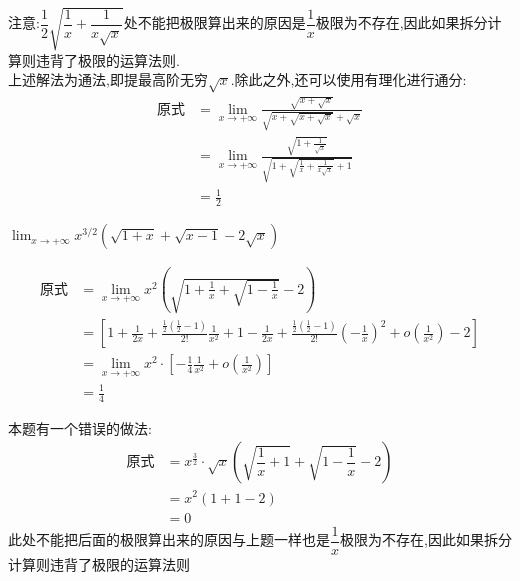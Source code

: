 \documentclass[8pt a4paper, oneside, UTF8]{ctexbook}
\begin{document}
\begin{sloppypar}
\begin{note}
        注意:$\dfrac{1}{2}\sqrt{\dfrac{1}{x}+\dfrac{1}{x\sqrt{x}}}$处不能把极限算出来的原因是$\dfrac{1}{x}$极限为不存在,因此如果拆分计算则违背了极限的运算法则.\\
        上述解法为通法,即提最高阶无穷$\sqrt{x}$.除此之外,还可以使用有理化进行通分:
        \begin{align*}
            \text{原式} & =\lim_{x\to+\infty}\frac{\sqrt{x+\sqrt{x}}}{\sqrt{x+\sqrt{x+\sqrt{x}}}+\sqrt{x}}                  \\
                      & = \lim_{x\to+\infty}\frac{\sqrt{1+\frac1{\sqrt{x}}}}{\sqrt{1+\sqrt{\frac1x+\frac1{x\sqrt{x}}}+1}} \\
                      & = \frac{1}{2}
        \end{align*}
    \end{note}
    \begin{problem}
    \uline{$\lim_{x\to+\infty}x^{3/2}\left(\sqrt{1+x}+\sqrt{x-1}-2\sqrt{x}\right)$}
    \end{problem}
    \begin{solution}
        \begin{align*}
            \text{原式} & = \lim_{x\to+\infty}  x^2(\sqrt{1+\frac{1}{x}+\sqrt{1-\frac{1}{x}}}-2)                                                                                              \\
                      & = [1+\frac{1}{2x}+\frac{\frac{1}{2}(\frac{1}{2}-1)}{2!}\frac{1}{x^{2}}+1-\frac{1}{2x}+\frac{\frac{1}{2}(\frac{1}{2}-1)}{2!}(-\frac{1}{x})^{2}+o(\frac{1}{x^{2}})-2] \\
                      & = \lim_{x\to+\infty}x^{2}\cdot[-\frac{1}{4}\frac{1}{x^{2}}+o(\frac{1}{x^{2}})]                                                                                      \\
                      & = \frac{1}{4}
        \end{align*}
    \end{solution}
    \begin{note}
        本题有一个错误的做法:
        \begin{align*}
            \text{原式} & = x^{\frac{3}{2}}\cdot \sqrt{x}(\sqrt{\dfrac{1}{x}+1}+\sqrt{1-\dfrac{1}{x}}-2) \\
                      & = x^2(1+1-2)                                                                   \\
                      & = 0
        \end{align*}
        此处不能把后面的极限算出来的原因与上题一样也是$\dfrac{1}{x}$极限为不存在,因此如果拆分计算则违背了极限的运算法则

\end{note}
\end{sloppypar}
\end{document}
